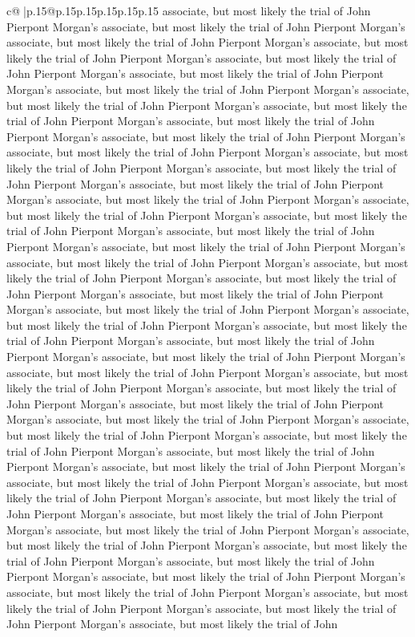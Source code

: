 \documentclass{article}
\begin{document}
{\begin{supertabular}{c@{$\;$}|p{.15\linewidth}@{}p{.15\linewidth}p{.15\linewidth}p{.15\linewidth}p{.15\linewidth}p{.15\linewidth}}
{{{associate, but most likely the trial of John Pierpont Morgan's associate, but most likely the trial of John Pierpont Morgan's associate, but most likely the trial of John Pierpont Morgan's associate, but most likely the trial of John Pierpont Morgan's associate, but most likely the trial of John Pierpont Morgan's associate, but most likely the trial of John Pierpont Morgan's associate, but most likely the trial of John Pierpont Morgan's associate, but most likely the trial of John Pierpont Morgan's associate, but most likely the trial of John Pierpont Morgan's associate, but most likely the trial of John Pierpont Morgan's associate, but most likely the trial of John Pierpont Morgan's associate, but most likely the trial of John Pierpont Morgan's associate, but most likely the trial of John Pierpont Morgan's associate, but most likely the trial of John Pierpont Morgan's associate, but most likely the trial of John Pierpont Morgan's associate, but most likely the trial of John Pierpont Morgan's associate, but most likely the trial of John Pierpont Morgan's associate, but most likely the trial of John Pierpont Morgan's associate, but most likely the trial of John Pierpont Morgan's associate, but most likely the trial of John Pierpont Morgan's associate, but most likely the trial of John Pierpont Morgan's associate, but most likely the trial of John Pierpont Morgan's associate, but most likely the trial of John Pierpont Morgan's associate, but most likely the trial of John Pierpont Morgan's associate, but most likely the trial of John Pierpont Morgan's associate, but most likely the trial of John Pierpont Morgan's associate, but most likely the trial of John Pierpont Morgan's associate, but most likely the trial of John Pierpont Morgan's associate, but most likely the trial of John Pierpont Morgan's associate, but most likely the trial of John Pierpont Morgan's associate, but most likely the trial of John Pierpont Morgan's associate, but most likely the trial of John Pierpont Morgan's associate, but most likely the trial of John Pierpont Morgan's associate, but most likely the trial of John Pierpont Morgan's associate, but most likely the trial of John Pierpont Morgan's associate, but most likely the trial of John Pierpont Morgan's associate, but most likely the trial of John Pierpont Morgan's associate, but most likely the trial of John Pierpont Morgan's associate, but most likely the trial of John Pierpont Morgan's associate, but most likely the trial of John Pierpont Morgan's associate, but most likely the trial of John Pierpont Morgan's associate, but most likely the trial of John Pierpont Morgan's associate, but most likely the trial of John Pierpont Morgan's associate, but most likely the trial of John Pierpont Morgan's associate, but most likely the trial of John Pierpont Morgan's associate, but most likely the trial of John Pierpont Morgan's associate, but most likely the trial of John Pierpont Morgan's associate, but most likely the trial of John Pierpont Morgan's associate, but most likely the trial of John Pierpont Morgan's associate, but most likely the trial of John Pierpont Morgan's associate, but most likely the trial of John }}}
\end{supertabular}}
\end{document}

